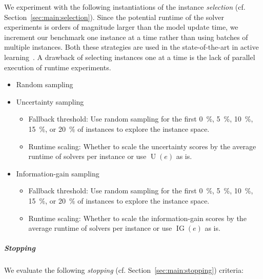 \documentclass[sn-basic, Numbered]{sn-jnl} %
\begin{document}
We experiment with the following instantiations of the instance \emph{selection} (cf. Section~\ref{sec:main:selection}).
Since the potential runtime of the solver experiments is orders of magnitude larger than the model update time, we increment our benchmark one instance at a time rather than using batches of multiple instances.
Both these strategies are used in the state-of-the-art in active learning~\cite{SinhaED19,2019gaal}.
A drawback of selecting instances one at a time is the lack of parallel execution of runtime experiments.

\begin{itemize}\setlength{\itemsep}{1pt}
  \item Random sampling 
  \item Uncertainty sampling
  \vspace*{-1ex}
  \begin{itemize}\setlength{\itemsep}{1pt}
    \item Fallback threshold: Use random sampling for the first \SI{0}{\%}, \SI{5}{\%}, \SI{10}{\%}, \SI{15}{\%}, or \SI{20}{\%} of instances to explore the instance space.
    \item Runtime scaling: Whether to scale the uncertainty scores by the average runtime of solvers per instance or use $\operatorname{U}(e)$ as is.
  \end{itemize}

  \item Information-gain sampling
  \vspace*{-1ex}
  \begin{itemize}
    \item Fallback threshold: Use random sampling for the first \SI{0}{\%}, \SI{5}{\%}, \SI{10}{\%}, \SI{15}{\%}, or \SI{20}{\%} of instances to explore the instance space.
    \item Runtime scaling: Whether to scale the information-gain scores by the average runtime of solvers per instance or use $\operatorname{IG}(e)$ as is.
  \end{itemize}
\end{itemize}

\subparagraph{Stopping}

We evaluate the following \emph{stopping} (cf. Section~\ref{sec:main:stopping}) criteria:
\end{document}
